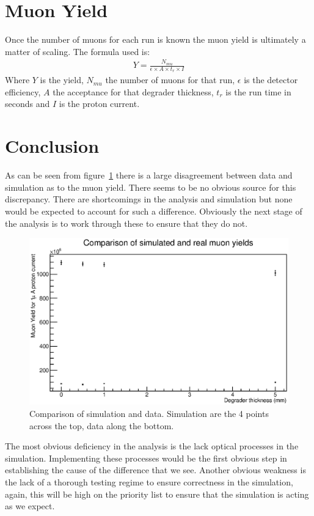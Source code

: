 \documentclass[]{article}
\begin{document}
\section{Muon Yield} %
\label{sec:muon_yield}
Once the number of muons for each run is known the muon yield is ultimately a matter of scaling. The formula used is:
\begin{align}
    Y = \frac{N_{mu}}{\epsilon \times A \times t_{r} \times I}
\end{align}
Where $Y$ is the yield, $N_{mu}$ the number of muons for that run, $\epsilon$ is the detector efficiency, $A$ the acceptance for that degrader thickness, $t_{r}$ is the run time in seconds and $I$ is the proton current.
\section{Conclusion} %
\label{sec:conclusion}
As can be seen from figure~\ref{fig:why_its_buggered} there is a large disagreement between data and simulation as to the muon yield. There seems to be no obvious source for this discrepancy. There are shortcomings in the analysis and simulation but none would be expected to account for such a difference. Obviously the next stage of the analysis is to work through these to ensure that they do not. 
\begin{figure}[htbp]
    \centering
        \includegraphics[width=\textwidth]{image/sim_vs_data.eps}
    \caption{Comparison of simulation and data. Simulation are the 4 points across the top, data along the bottom.}
    \label{fig:why_its_buggered}
\end{figure}

The most obvious deficiency in the analysis is the lack optical processes in the simulation. Implementing these processes would be the first obvious step in establishing the cause of the difference that we see. Another obvious weakness is the lack of a thorough testing regime to ensure correctness in the simulation, again, this will be high on the priority list to ensure that the simulation is acting as we expect. 
\end{document}
